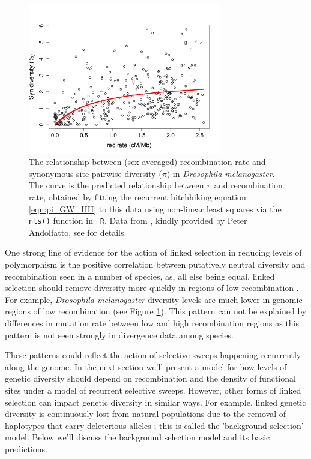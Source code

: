 \begin{figure}
\begin{center}
\includegraphics[width=0.75\textwidth]{figures/Genomewide_HH.png}
\end{center}
\caption{The relationship between (sex-averaged) recombination rate and synonymous
  site pairwise diversity ($\pi$) in {\it Drosophila melanogaster}. The curve is the
  predicted relationship between $\pi$ and recombination rate, obtained
  by fitting the recurrent hitchhiking equation \eqref{eqn:pi_GW_HH} to this data 
 using non-linear least squares via the {\tt nls()} function in {\tt
   R}.  Data from \citep{Shapiro:07}, kindly provided by Peter
  Andolfatto, see \citet{sella2009pervasive} for details. } \label{fig:GW_hitchhiking_reduction}  %
\end{figure}

One strong line of evidence for the action of linked selection in reducing levels of
polymorphism is the positive correlation between putatively
neutral diversity and recombination seen in a number of species, as, all
else being equal, linked selection should remove diversity more quickly in regions of low recombination 
\citep{Aguade:89,Begun:92,Wiehe:93,Cutter:10,Cai:09}. For example, {\it Drosophila melanogaster} diversity
levels are much lower in genomic regions of low recombination (see
Figure \ref{fig:GW_hitchhiking_reduction}). This pattern can not be
explained by differences in mutation rate between low and high
recombination regions as this pattern is not seen strongly in
divergence data among species.

These patterns could reflect the action of selective sweeps happening
recurrently along the genome. In the next section we'll present a model for how levels of
genetic diversity should depend on recombination and the density of
functional sites under a model of recurrent selective sweeps.
However, other forms of linked selection can impact genetic
diversity in similar ways. For example, linked genetic diversity is
continuously lost from natural populations due to the removal of
haplotypes that carry deleterious alleles
\citep{Charlesworth:95,Hudson:95}; this is called the 'background selection'
model. Below we'll discuss the background selection model and its
basic predictions.


